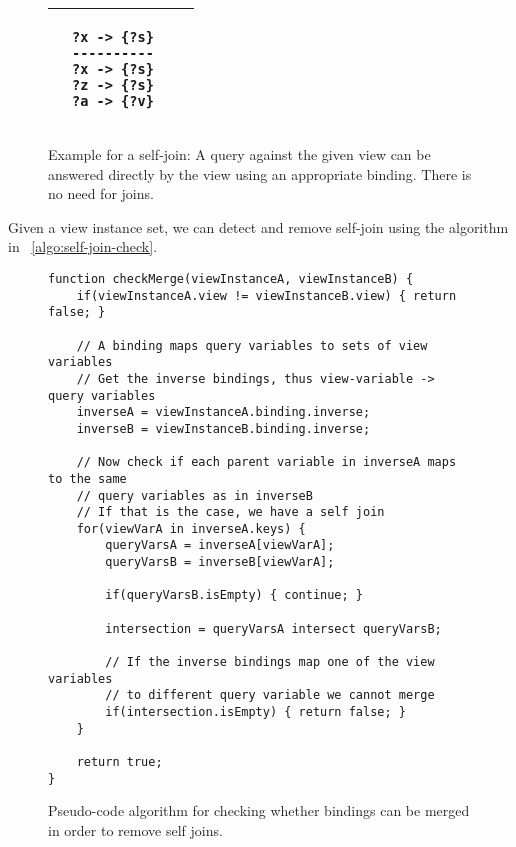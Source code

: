 \documentclass[a4paper,twoside,bibtotoc,abstracton,12pt,BCOR=15mm]{scrreprt}
\begin{document}
\begin{figure}[!h]
\begin{tabular}{llll}
&

\begin{minipage}{3cm}
\begin{scriptsize}
\begin{verbatim}
?x -> {?s}
----------
?x -> {?s}
?z -> {?s}
?a -> {?v}
\end{verbatim}
\end{scriptsize}
\end{minipage}

\\

\bottomrule
\end{tabular}
\caption{Example for a self-join: A query against the given view can be answered directly by the view using an appropriate binding. There is no need for joins.}
\label{fig:running-example}
\end{figure}

Given a view instance set, we can detect and remove self-join using the algorithm in ~\autoref{algo:self-join-check}.

\begin{figure}[!h]
\begin{lstlisting}
function checkMerge(viewInstanceA, viewInstanceB) {
    if(viewInstanceA.view != viewInstanceB.view) { return false; }

	// A binding maps query variables to sets of view variables
	// Get the inverse bindings, thus view-variable -> query variables
	inverseA = viewInstanceA.binding.inverse;
	inverseB = viewInstanceB.binding.inverse;
		
	// Now check if each parent variable in inverseA maps to the same
	// query variables as in inverseB
	// If that is the case, we have a self join
	for(viewVarA in inverseA.keys) {
	    queryVarsA = inverseA[viewVarA];
	    queryVarsB = inverseB[viewVarA];
	    
	    if(queryVarsB.isEmpty) { continue; }
	    
	    intersection = queryVarsA intersect queryVarsB; 
	    
	    // If the inverse bindings map one of the view variables
	    // to different query variable we cannot merge
	    if(intersection.isEmpty) { return false; }
	}
	
	return true;
}
\end{lstlisting}
\caption{Pseudo-code algorithm for checking whether bindings can be merged in order to remove self joins.}
\label{algo:self-join-check}
\end{figure}
\end{document}
